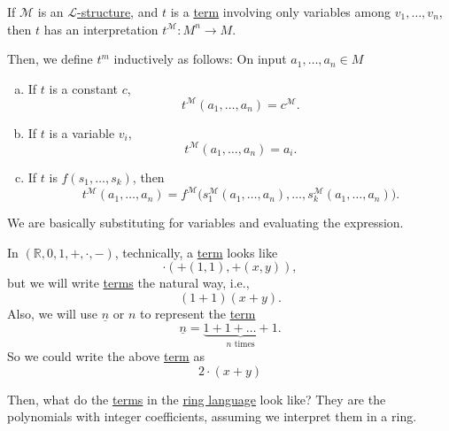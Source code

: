 If \(\mathcal{M}\) is an \hyperref[def:structure]{\(\mathcal{L} \)-structure}, and \(t\) is a \hyperref[def:term]{term} involving only variables among \(v_1, \ldots , v_n\), then \(t\) has an interpretation \(t^{\mathcal{M}} \colon M^n \to M\).

Then, we define \(t^m\) inductively as follows: On input \(a_1, \ldots , a_n \in M\)
\begin{enumerate}[(a)]
	\item If \(t\) is a constant \(c\),
	      \[
		      t^{\mathcal{M} } (a_1, \ldots , a_n) = c^{\mathcal{M} }.
	      \]
	\item If \(t\) is a variable \(v_i\),
	      \[
		      t^{\mathcal{M} } (a_1, \ldots , a_n) = a_i.
	      \]
	\item If \(t\) is \(f(s_1, \ldots , s_k)\), then
	      \[
		      t^{\mathcal{M} } (a_1, \ldots , a_n) = f^{\mathcal{M} } \big(s_1^{\mathcal{M} }(a_1, \ldots , a_n), \ldots , s_k^{\mathcal{M}}(a_1, \ldots , a_n) \big).
	      \]
\end{enumerate}

\begin{intuition}
	We are basically substituting for variables and evaluating the expression.
\end{intuition}

\begin{eg}
	In \((\mathbb{R} , 0, 1, +, \cdot, -)\), technically, a \hyperref[def:term]{term} looks like
	\[
		\cdot(+(1, 1), +(x, y)),
	\]
	but we will write \hyperref[def:term]{terms} the natural way, i.e.,
	\[
		(1+1) (x+y).
	\]
	Also, we will use \(\underline{n}\) or \(n\) to represent the \hyperref[def:term]{term}
	\[
		\underline{n} = \underbrace{1+1+\ldots +1}_{n\text{ times}}.
	\]
	So we could write the above \hyperref[def:term]{term} as
	\[
		2\cdot(x+y)
	\]
\end{eg}

Then, what do the \hyperref[def:term]{terms} in the \hyperref[eg:language-ring]{ring language} look like? They are the polynomials with integer coefficients, assuming we interpret  them in a ring.

